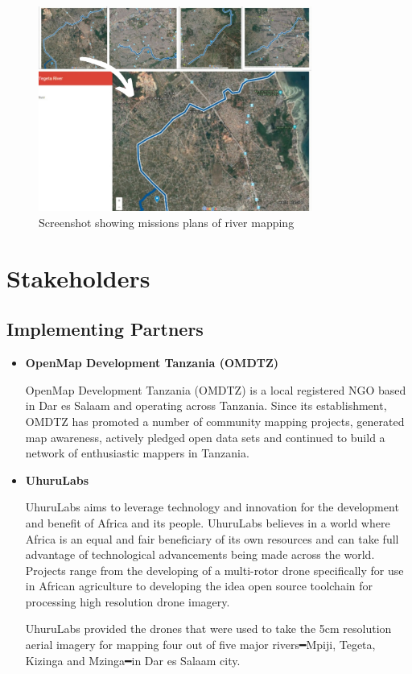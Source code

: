 \documentclass[a4paper,12pt,twoside]{article}
\begin{document}
    \begin{figure}%
        \centering
        \includegraphics[width=0.8\textwidth]{images/image14.jpg}
        \caption{Screenshot showing missions plans of river mapping}
    \end{figure}

\section{Stakeholders}

\subsection{Implementing Partners}

    \begin{itemize}
        \item \textbf{OpenMap Development Tanzania (OMDTZ)} %
    
        OpenMap Development Tanzania (OMDTZ) is a local registered NGO based in Dar es Salaam and operating across Tanzania. Since its establishment, OMDTZ has promoted a number of community mapping projects, generated map awareness, actively pledged open data sets and continued to build a network of enthusiastic mappers in Tanzania.
    
        \item \textbf{UhuruLabs}
    
        UhuruLabs aims to leverage technology and innovation for the development and benefit of Africa and its people. UhuruLabs believes in a world where Africa is an equal and fair beneficiary of its own resources and can take full advantage of technological advancements being made across the world. Projects range from the developing of a multi-rotor drone specifically for use in African agriculture to developing the idea open source toolchain for processing high resolution drone imagery. 
    
        UhuruLabs provided the drones that were used to take the 5cm resolution aerial imagery for mapping four out of five major rivers━Mpiji, Tegeta, Kizinga and Mzinga━in Dar es Salaam city.
    
    \end{itemize}
\end{document}
